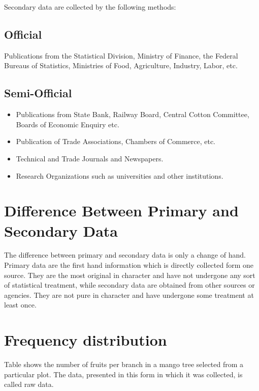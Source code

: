 \documentclass[
]{book}
\providecommand{\tightlist}{%
  \setlength{\itemsep}{0pt}\setlength{\parskip}{0pt}}
\begin{document}
Secondary data are collected by the following methods:

\subsection{Official}\label{official}

Publications from the Statistical Division, Ministry of Finance, the
Federal Bureaus of Statistics, Ministries of Food, Agriculture,
Industry, Labor, etc.

\subsection{Semi-Official}\label{semi-official}

\begin{itemize}
\tightlist
\item
  Publications from State Bank, Railway Board, Central Cotton
  Committee, Boards of Economic Enquiry etc.\\
\item
  Publication of Trade Associations, Chambers of Commerce, etc.\\
\item
  Technical and Trade Journals and Newspapers.\\
\item
  Research Organizations such as universities and other institutions.
\end{itemize}

\section{Difference Between Primary and Secondary Data}\label{difference-between-primary-and-secondary-data}

The difference between primary and secondary data is only a change of
hand. Primary data are the first hand information which is directly
collected form one source. They are the most original in character and
have not undergone any sort of statistical treatment, while secondary
data are obtained from other sources or agencies. They are not pure in
character and have undergone some treatment at least once.

\section{Frequency distribution}\label{frequency-distribution}

Table shows the number of fruits per branch in a mango
tree selected from a particular plot. The data, presented in this form
in which it was collected, is called raw data.
\end{document}
